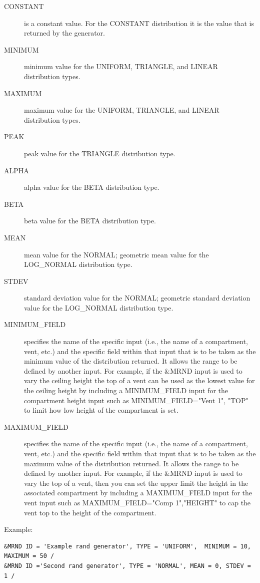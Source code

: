 \documentclass[12pt,twoside]{book}
\begin{document}
\begin{description}
  \item[CONSTANT] is a constant value. For the {\ct CONSTANT} distribution it is the value that is returned by the generator.
  \item[MINIMUM] minimum value for the {\ct UNIFORM}, {\ct TRIANGLE}, and {\ct LINEAR} distribution types.
  \item[MAXIMUM] maximum value for the {\ct UNIFORM}, {\ct TRIANGLE}, and {\ct LINEAR} distribution types.
  \item[PEAK] peak value for the {\ct TRIANGLE} distribution type.
  \item[ALPHA] alpha value for the {\ct BETA} distribution type.
  \item[BETA] beta value for the {\ct BETA} distribution type.
  \item[MEAN] mean value for the {\ct NORMAL}; geometric mean value for the {\ct LOG\_NORMAL} distribution type.
  \item[STDEV] standard deviation value for the {\ct NORMAL}; geometric standard deviation value for the {\ct LOG\_NORMAL} distribution type.
  \item[MINIMUM\_FIELD] specifies the name of the specific input (i.e., the name of a compartment, vent, etc.) and the specific field within that input that is to be taken as the minimum value of the distribution returned. It allows the range to be defined by another input. For example, if the {\ct \&MRND} input is used to vary the ceiling height the top of a vent can be used as the lowest value for the ceiling height by including a {\ct MINIMUM\_FIELD} input for the compartment height input such as {\ct MINIMUM\_FIELD="Vent 1", "TOP"} to limit how low height of the compartment is set.
  \item[MAXIMUM\_FIELD] specifies the name of the specific input (i.e., the name of a compartment, vent, etc.) and the specific field within that input that is to be taken as the maximum value of the distribution returned. It allows the range to be defined by another input. For example, if the {\ct \&MRND} input is used to vary the top of a vent, then you can set the upper limit the height in the associated compartment by including a {\ct MAXIMUM\_FIELD} input for the vent input such as {\ct MAXIMUM\_FIELD="Comp 1","HEIGHT"} to cap the vent top to the height of the compartment.
\end{description}

\vspace{\baselineskip}
\noindent Example:
\begin{lstlisting}
&MRND ID = 'Example rand generator', TYPE = 'UNIFORM',  MINIMUM = 10, MAXIMUM = 50 /
&MRND ID ='Second rand generator', TYPE = 'NORMAL', MEAN = 0, STDEV = 1 /
\end{lstlisting}
\end{document}
